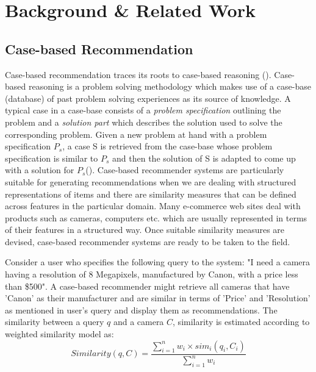 \chapter{Background \& Related Work}
\label{chap:background}

\section{Case-based Recommendation}
Case-based recommendation traces its roots to case-based reasoning (\cite{aamodt94}).
Case-based reasoning is a problem solving methodology which makes use of a case-base (database) of past problem solving experiences as its source of knowledge. 
A typical case in a case-base consists of a \textit{problem specification} outlining the problem and a \textit{solution part} which describes the solution used to solve the corresponding problem.
Given a new problem at hand with a problem specification $P_s$, a case S is retrieved from the case-base whose problem specification is similar to $P_s$ and then the solution of S is adapted to come up with a solution for $P_s$(\cite{smyth2007}).
Case-based recommender systems are particularly suitable for generating recommendations when we are dealing with structured representations of items and there are similarity measures that can be defined across features in the particular domain. 
Many e-commerce web sites deal with products such as cameras, computers etc. which are usually represented in terms of their features in a structured way. 
Once suitable similarity measures are devised, case-based recommender systems are ready to be taken to the field.

Consider a user who specifies the following query to the system: "I need a camera having a resolution of 8 Megapixels, manufactured by Canon, with a price less than \$500".
A case-based recommender might retrieve all cameras that have 'Canon' as their manufacturer and are similar in terms of 'Price' and 'Resolution' as mentioned in user's query and display them as recommendations.
The similarity between a query $q$ and a camera $C$, similarity is estimated according to weighted similarity model as:
\begin{equation}
\label{eq:sim}
Similarity(q, C) = \frac{\sum_{i=1}^{n}{w_i \times sim_i(q_i, C_i)}}{\sum_{i=1}^{n}w_i}
\end{equation}

